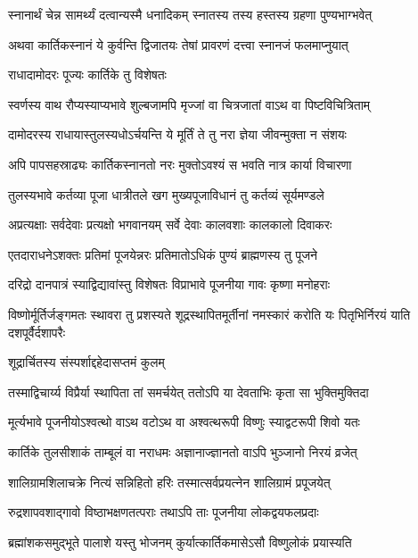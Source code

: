 \twolineshloka
{स्नानार्थं चेन्न सामर्थ्यं दत्वान्यस्मै धनादिकम्}
{स्नातस्य तस्य हस्तस्य ग्रहणा पुण्यभाग्भवेत्} %

\twolineshloka
{अथवा कार्तिकस्नानं ये कुर्वन्ति द्विजातयः}
{तेषां प्रावरणं दत्त्वा स्नानजं फलमाप्नुयात्} %


\onelineshloka
{राधादामोदरः पूज्यः कार्तिके तु विशेषतः} %

\twolineshloka
{स्वर्णस्य वाथ रौप्यस्याप्यभावे शुल्बजामपि}
{मृज्जां वा चित्रजातां वाऽथ वा पिष्टविचित्रिताम्} %

\twolineshloka
{दामोदरस्य राधायास्तुलस्यधोऽर्चयन्ति ये}
{मूर्तिं ते तु नरा ज्ञेया जीवन्मुक्ता न संशयः} %

\twolineshloka
{अपि पापसहस्राढ्यः कार्तिकस्नानतो नरः}
{मुक्तोऽवश्यं स भवति नात्र कार्या विचारणा} %

\twolineshloka
{तुलस्यभावे कर्तव्या पूजा धात्रीतले खग}
{मुख्यपूजाविधानं तु कर्तव्यं सूर्यमण्डले} %

\twolineshloka
{अप्रत्यक्षाः सर्वदेवाः प्रत्यक्षो भगवानयम्}
{सर्वे देवाः कालवशाः कालकालो दिवाकरः} %

\twolineshloka
{एतदाराधनेऽशक्तः प्रतिमां पूजयेन्नरः}
{प्रतिमातोऽधिकं पुण्यं ब्राह्मणस्य तु पूजने} %

\twolineshloka
{दरिद्रो दानपात्रं स्याद्विद्यावांस्तु विशेषतः}
{विप्राभावे पूजनीया गावः कृष्णा मनोहराः} %

\threelineshloka
{विष्णोर्मूर्तिर्जङ्गमतः स्थावरा तु प्रशस्यते}
{शूद्रस्थापितमूर्तीनां नमस्कारं करोति यः}
{पितृभिर्निरयं याति दशपूर्वैर्दशापरैः} %


\onelineshloka
{शूद्रार्चितस्य संस्पर्शाद्दहेदासप्तमं कुलम्} %

\twolineshloka
{तस्माद्विचार्य्य विप्रैर्या स्थापिता तां समर्चयेत्}
{ततोऽपि या देवताभिः कृता सा भुक्तिमुक्तिदा} %

\twolineshloka
{मूर्त्यभावे पूजनीयोऽश्वत्थो वाऽथ वटोऽथ वा}
{अश्वत्थरूपी विष्णुः स्याद्वटरूपी शिवो यतः} %

\twolineshloka
{कार्तिके तुलसीशाकं ताम्बूलं वा नराधमः}
{अज्ञानाज्ज्ञानतो वाऽपि भुञ्जानो निरयं व्रजेत्} %

\twolineshloka
{शालिग्रामशिलाचक्रे नित्यं सन्निहितो हरिः}
{तस्मात्सर्वप्रयत्नेन शालिग्रामं प्रपूजयेत्} %

\twolineshloka
{रुद्रशापवशाद्गावो विष्ठाभक्षणतत्पराः}
{तथाऽपि ताः पूजनीया लोकद्वयफलप्रदाः} %

\twolineshloka
{ब्रह्मांशकसमुद्भूते पालाशे यस्तु भोजनम्}
{कुर्यात्कार्तिकमासेऽसौ विष्णुलोकं प्रयास्यति} %

